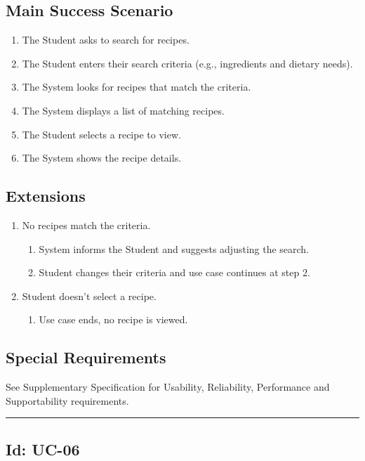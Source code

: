 \documentclass[10pt,letterpaper]{article}
\newcommand{\ucseparator}{\vspace{1em}\noindent\rule{\linewidth}{0.4pt}\vspace{1.5em}}
\begin{document}
\subsection*{Main Success Scenario}
\begin{enumerate}
    \item The Student asks to search for recipes.
    \item The Student enters their search criteria (e.g., ingredients and dietary needs).
    \item The System looks for recipes that match the criteria.
    \item The System displays a list of matching recipes.
    \item The Student selects a recipe to view.
    \item The System shows the recipe details.
\end{enumerate}

\subsection*{Extensions}
\begin{enumerate}
    \item[3a.] No recipes match the criteria.
    \begin{enumerate}
        \item[1.] System informs the Student and suggests adjusting the search.
        \item[2.] Student changes their criteria and use case continues at step 2.
    \end{enumerate}
    \item[5a.] Student doesn't select a recipe.
    \begin{enumerate}
        \item[1.] Use case ends, no recipe is viewed.
    \end{enumerate}
\end{enumerate}

\subsection*{Special Requirements}
See Supplementary Specification for Usability, Reliability, Performance and Supportability requirements.

\ucseparator

\subsection*{Id: UC-06}
\end{document}

